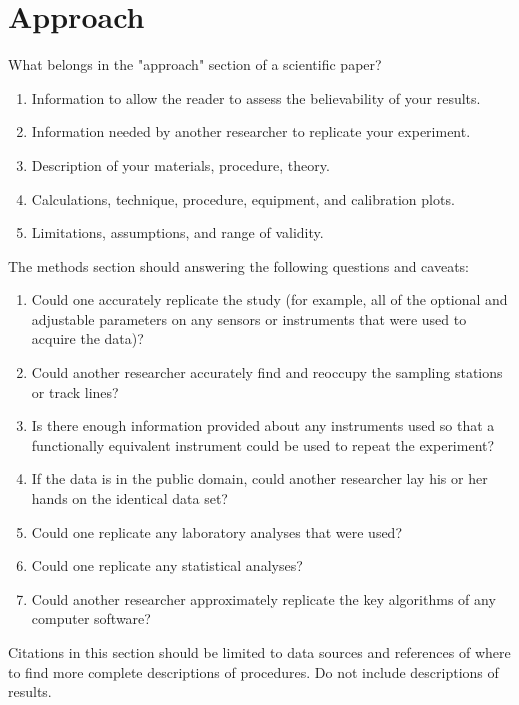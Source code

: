 \section{Approach}
\label{sec:Approach}

What belongs in the "approach" section of a scientific paper?

\begin{enumerate}
  \item Information to allow the reader to assess the believability of your results.
  \item Information needed by another researcher to replicate your experiment.
  \item Description of your materials, procedure, theory.
  \item Calculations, technique, procedure, equipment, and calibration plots. 
  \item Limitations, assumptions, and range of validity. 
\end{enumerate}

The methods section should answering the following questions and caveats: 

\begin{enumerate}
  \item Could one accurately replicate the study (for example, all of the
  optional and adjustable parameters on any sensors or instruments that were
  used to acquire the data)? 
  \item Could another researcher accurately find and reoccupy the sampling
  stations or track lines?
  \item Is there enough information provided about any
  instruments used so that a functionally equivalent instrument could be used to
  repeat the experiment?
  \item If the data is in the public domain, could another researcher lay his or
  her hands on the identical data set?
  \item Could one replicate any laboratory
  analyses that were used?
  \item Could one replicate any statistical analyses?
  \item Could another researcher approximately replicate the key algorithms of
  any computer software?
\end{enumerate}

Citations in this section should be limited to data sources and references of
where to find more complete descriptions of procedures. Do not include
descriptions of results.


